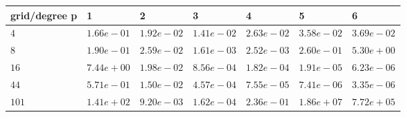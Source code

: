 \begin{tabular}{lllllll}
\hline
 grid/degree p   & 1          & 2          & 3          & 4          & 5          & 6          \\
\hline
 $4$             & $1.66e-01$ & $1.92e-02$ & $1.41e-02$ & $2.63e-02$ & $3.58e-02$ & $3.69e-02$ \\
 $8$             & $1.90e-01$ & $2.59e-02$ & $1.61e-03$ & $2.52e-03$ & $2.60e-01$ & $5.30e+00$ \\
 $16$            & $7.44e+00$ & $1.98e-02$ & $8.56e-04$ & $1.82e-04$ & $1.91e-05$ & $6.23e-06$ \\
 $44$            & $5.71e-01$ & $1.50e-02$ & $4.57e-04$ & $7.55e-05$ & $7.41e-06$ & $3.35e-06$ \\
 $101$           & $1.41e+02$ & $9.20e-03$ & $1.62e-04$ & $2.36e-01$ & $1.86e+07$ & $7.72e+05$ \\
\hline
\end{tabular}